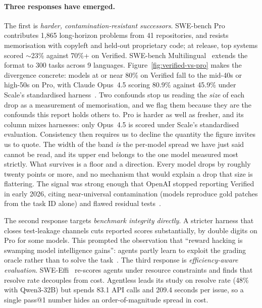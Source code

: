 \documentclass[
  english,        %
  font=times,     %
  twocolumn,      %
]{tumarticle}
\begin{document}
\paragraph{Three responses have emerged.}
The first is \emph{harder, contamination-resistant successors}. SWE-bench
Pro~\cite{deng2025swebenchpro} contributes 1{,}865 long-horizon problems from 41
repositories, and resists memorisation with copyleft and held-out proprietary
code; at release, top systems scored $\sim$23\% against 70\%+ on Verified.
SWE-bench Multilingual~\cite{swebench2025multilingual} extends the format to 300
tasks across 9 languages. Figure~\ref{fig:verified-vs-pro} makes the divergence
concrete: models at or near 80\% on Verified fall to the mid-40s or high-50s on
Pro, with Claude Opus~4.5 scoring 80.9\% against 45.9\% under Scale's standardised
harness~\cite{deng2025swebenchpro,agentmarketcap2026gap}. Two confounds stop us
reading the \emph{size} of each drop as a measurement of memorisation, and we flag
them because they are the confounds this report holds others to. Pro is harder as
well as fresher, and its column mixes harnesses: only Opus~4.5 is scored under
Scale's standardised evaluation. Consistency then requires us to decline the
quantity the figure invites us to quote. The width of the band \emph{is} the
per-model spread we have just said cannot be read, and its upper end belongs to
the one model measured most strictly. What survives is a floor and a direction.
Every model drops by roughly twenty points or more, and no mechanism that would
explain a drop that size is flattering. The signal was strong enough that OpenAI stopped
reporting Verified in early 2026, citing near-universal contamination (models
reproduce gold patches from the task ID alone) and flawed residual
tests~\cite{openai2026swebench}.

The second response targets \emph{benchmark integrity directly}. A stricter
harness that closes test-leakage channels cuts reported scores substantially, by
double digits on Pro for some models. This prompted the observation that ``reward
hacking is swamping model intelligence gains'': agents partly learn to exploit the
grading oracle rather than to solve the task~\cite{cursor2025rewardhacking}. The
third response is \emph{efficiency-aware evaluation}. SWE-Effi~\cite{sweeffi2025}
re-scores agents under resource constraints and finds that resolve rate decouples
from cost. Agentless leads its study on resolve rate (48\% with Qwen3-32B) but
spends 83.1 API calls and 209.4 seconds per issue, so a single pass@1 number hides
an order-of-magnitude spread in cost.
\end{document}
